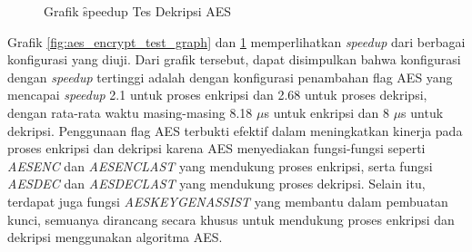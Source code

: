 \begin{figure}
    \centering
    \caption{Grafik \f{speedup} Tes Dekripsi AES}
    \label{fig:aes_decrypt_test_graph}
\end{figure}

Grafik \ref{fig:aes_encrypt_test_graph} dan \ref{fig:aes_decrypt_test_graph} memperlihatkan \textit{speedup} dari berbagai konfigurasi yang diuji. Dari grafik tersebut, dapat disimpulkan bahwa konfigurasi dengan \textit{speedup} tertinggi adalah dengan konfigurasi penambahan flag AES yang mencapai \textit{speedup} 2.1 untuk proses enkripsi dan 2.68 untuk proses dekripsi, dengan rata-rata waktu masing-masing 8.18 $\mu$s untuk enkripsi dan 8 $\mu$s untuk dekripsi. Penggunaan flag AES terbukti efektif dalam meningkatkan kinerja pada proses enkripsi dan dekripsi karena AES menyediakan fungsi-fungsi seperti \textit{AESENC} dan \textit{AESENCLAST} yang mendukung proses enkripsi, serta fungsi \textit{AESDEC} dan \textit{AESDECLAST} yang mendukung proses dekripsi. Selain itu, terdapat juga fungsi \textit{AESKEYGENASSIST} yang membantu dalam pembuatan kunci, semuanya dirancang secara khusus untuk mendukung proses enkripsi dan dekripsi menggunakan algoritma AES.